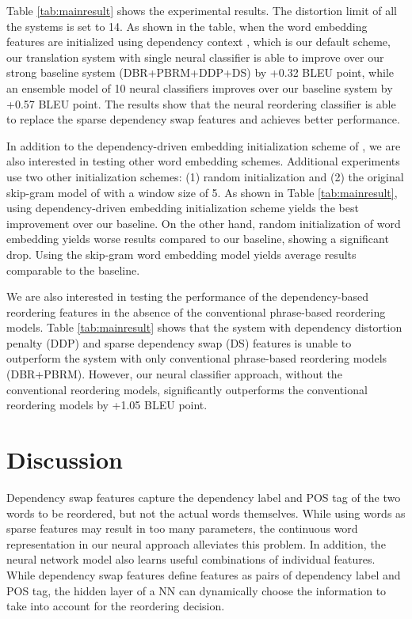 \documentclass[letterpaper]{article}
\begin{document}
Table \ref{tab:mainresult} shows the experimental results. The distortion limit of all the systems is set to 14. As shown in the table, when the word embedding features are initialized using dependency context \cite{bansal_tailoring_2014}, which is our default scheme, our translation system with single neural classifier is able to improve over our strong baseline system (DBR+PBRM+DDP+DS) by +0.32 BLEU point, while an ensemble model of 10 neural classifiers improves over our baseline system by +0.57 BLEU point. The results show that the neural reordering classifier is able to replace the sparse dependency swap features and achieves better performance.

In addition to the dependency-driven embedding initialization scheme of \cite{bansal_tailoring_2014}, we are also interested in testing other word embedding schemes. Additional experiments use two other initialization schemes: (1) random initialization and (2) the original skip-gram model of \cite{mikolov_efficient_2013} with a window size of 5. As shown in Table \ref{tab:mainresult}, using dependency-driven embedding initialization scheme yields the best improvement over our baseline. On the other hand, random initialization of word embedding yields worse results compared to our baseline, showing a significant drop. Using the skip-gram word embedding model yields average results comparable to the baseline.

We are also interested in testing the performance of the dependency-based reordering features in the absence of the conventional phrase-based reordering models. Table \ref{tab:mainresult} shows that the system with dependency distortion penalty (DDP) and sparse dependency swap (DS) features is unable to outperform the system with only conventional phrase-based reordering models (DBR+PBRM). However, our neural classifier approach, without the conventional reordering models, significantly outperforms the conventional reordering models by +1.05 BLEU point.

\section{Discussion}

Dependency swap features capture the dependency label and POS tag of the two words to be reordered, but not the actual words themselves. While using words as sparse features may result in too many parameters, the continuous word representation in our neural approach alleviates this problem. In addition, the neural network model also learns useful combinations of individual features. While dependency swap features \cite{hadiwinoto_swap_2016} define features as pairs of dependency label and POS tag, the hidden layer of a NN can dynamically choose the information to take into account for the reordering decision.
\end{document}
